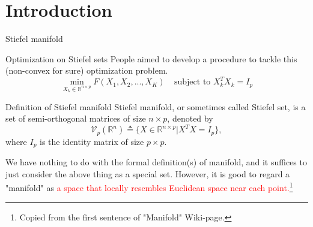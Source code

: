 \documentclass[aspectratio=43, 10pt]{beamer}
\begin{document}
\section{Introduction}
  \begin{frame}[t]{Stiefel manifold}
    \vspace{-0.5cm}
    \begin{block}{Optimization on Stiefel sets}
        People aimed to develop a procedure to tackle this (non-convex for sure) optimization problem. 
        $$\min_{X_k \in \mathbb{R}^{n \times p}} F(X_1,X_2,...,X_K) ~~~~~ \text{subject to   } X_k^T X_k = I_p$$
    \end{block}

    \pause 
    \vspace{-0.1cm}
    \begin{block}{Definition of Stiefel manifold}
        Stiefel manifold, or sometimes called Stiefel set, is a set of semi-orthogonal matrices of size $n \times p$, denoted by 
        $$\mathcal{V}_p(\mathbb{R}^n) \triangleq \{ X \in \mathbb{R}^{n \times p} | X^T X = I_p\},$$
        where $I_p$ is the identity matrix of size $p \times p$.
    \end{block}
    
    \pause 
    We have nothing to do with the formal definition(s) of manifold, and it suffices to just consider the above thing as a special set. However, it is good to regard a "manifold" as \textcolor{red}{a space that locally resembles Euclidean space near each point.}\footnote{Copied from the first sentence of "Manifold" Wiki-page.}
    
  \end{frame}
\end{document}
